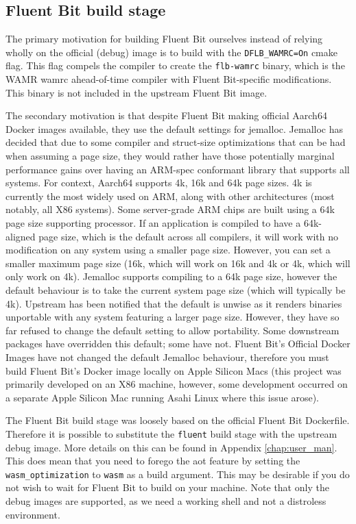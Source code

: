 \subsection{Fluent Bit build stage}
The primary motivation for building Fluent Bit ourselves instead of relying wholly on the official (debug) image is to build with the \texttt{DFLB\_WAMRC=On} cmake flag. This flag compels the compiler to create the \texttt{flb-wamrc} binary, which is the WAMR wamrc ahead-of-time compiler with Fluent Bit-specific modifications. This binary is not included in the upstream Fluent Bit image.

The secondary motivation is that despite Fluent Bit making official Aarch64 Docker images available, they use the default settings for \Gls{jemalloc}. Jemalloc has decided that due to some compiler and struct-size optimizations that can be had when assuming a page size, they would rather have those potentially marginal performance gains over having an ARM-spec conformant library that supports all systems. For context, Aarch64 supports 4k, 16k and 64k page sizes. 4k is currently the most widely used on ARM, along with other architectures (most notably, all X86 systems). Some server-grade ARM chips are built using a 64k page size supporting processor. If an application is compiled to have a 64k-aligned page size, which is the default across all compilers, it will work with no modification on any system using a smaller page size. However, you can set a smaller maximum page size (16k, which will work on 16k and 4k or 4k, which will only work on 4k). Jemalloc supports compiling to a 64k page size, however the default behaviour is to take the current system page size (which will typically be 4k). Upstream has been notified that the default is unwise as it renders binaries unportable with any system featuring a larger page size. However, they have so far refused to change the default setting to allow portability. Some downstream packages have overridden this default; some have not. Fluent Bit's Official Docker Images have not changed the default Jemalloc behaviour, therefore you must build Fluent Bit's Docker image locally on Apple Silicon Macs (this project was primarily developed on an X86 machine, however, some development occurred on a separate Apple Silicon Mac running Asahi Linux where this issue arose). 

The Fluent Bit build stage was loosely based on the official Fluent Bit Dockerfile. Therefore it is possible to substitute the \texttt{fluent} build stage with the upstream debug image. More details on this can be found in Appendix \ref{chap:user_man}. This does mean that you need to forego the \acrlong{aot} feature by setting the \texttt{wasm\_optimization} to \texttt{wasm} as a build argument. This may be desirable if you do not wish to wait for Fluent Bit to build on your machine. Note that only the debug images are supported, as we need a working shell and not a distroless environment. 

